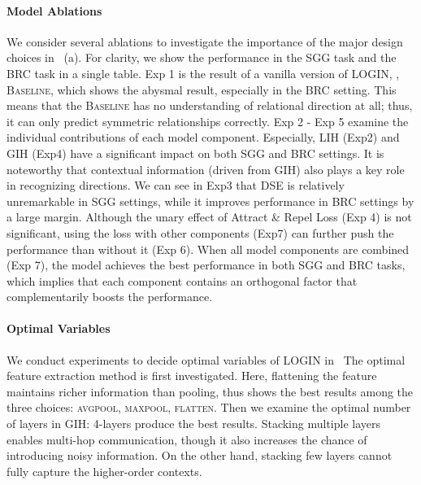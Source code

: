         \paragraph{Model Ablations}
            We consider several ablations to investigate the importance of the major design choices in~ (a). For clarity, we show the performance in the SGG task and the BRC task in a single table. 
            Exp 1 is the result of a vanilla version of LOGIN, \ie, \textsc{Baseline}, which shows the abysmal result, especially in the BRC setting. This means that the \textsc{Baseline} has no understanding of relational direction at all; thus, it can only predict symmetric relationships correctly.
            Exp 2 - Exp 5 examine the individual contributions of each model component. Especially, LIH (Exp2) and GIH (Exp4) have a significant impact on both SGG and BRC settings. It is noteworthy that contextual information (driven from GIH) also plays a key role in recognizing directions.
            We can see in Exp3 that DSE is relatively unremarkable in SGG settings, while it improves performance in BRC settings by a large margin.
            Although the unary effect of Attract \& Repel Loss  (Exp 4) is not significant, using the loss with other components (Exp7) can further push the performance than without it (Exp 6).
            When all model components are combined (Exp 7), the model achieves the best performance in both SGG and BRC tasks, which implies that each component contains an orthogonal factor that complementarily boosts the performance.
            
        \paragraph{Optimal Variables}
            We conduct experiments to decide optimal variables of LOGIN in~
            The optimal feature extraction method is first investigated. Here, flattening the feature maintains richer information than pooling, thus shows the best results among the three choices: \textsc{avgpool}, \textsc{maxpool}, \textsc{flatten}.
            Then we examine the optimal number of layers in GIH: 4-layers produce the best results.
            Stacking multiple layers enables multi-hop communication, though it also increases the chance of introducing noisy information.
            On the other hand, stacking few layers cannot fully capture the higher-order contexts.
        
